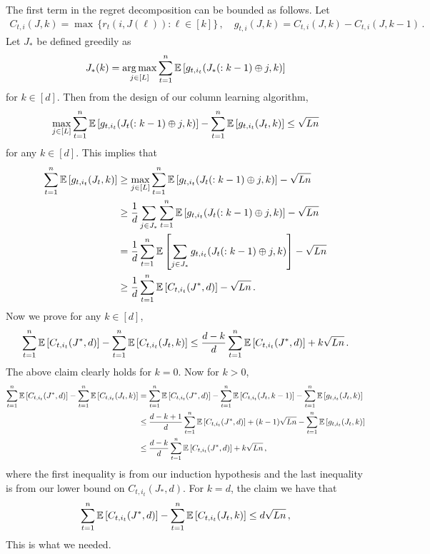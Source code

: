 The first term in the regret decomposition can be bounded as follows. Let
\begin{align*}
  C_{t, i}(J, k) =
  \max \, \{r_t(i, J(\ell)): \ell \in [k]\}\,, \quad
  g_{t, i}(J, k) =
  C_{t, i}(J, k) -   C_{t, i}(J, k - 1)\,.
\end{align*}
Let $J_\ast$ be defined greedily as
\begin{align*}
  J_\ast(k) =
  \mathop{\rm arg\,max}_{j \in [L]} \sum_{t = 1}^n \mathbb{E}\left[g_{t, i_t}(J_\ast(: k - 1) \oplus j, k)\right]
\end{align*}
for $k \in [d]$. Then from the design of our column learning algorithm,
\begin{align*}
  \max_{j \in [L]} \sum_{t = 1}^n \mathbb{E}\left[g_{t, i_t}(J_t(: k - 1) \oplus j, k)\right] -
  \sum_{t = 1}^n \mathbb{E}\left[g_{t, i_t}(J_t, k)\right] \leq
  \sqrt{L n}
\end{align*}
for any $k \in [d]$. This implies that
\begin{align*}
  \sum_{t = 1}^n \mathbb{E}\left[g_{t, i_t}(J_t, k)\right]
  & \geq \max_{j \in [L]} \sum_{t = 1}^n \mathbb{E}\left[g_{t, i_t}(J_t(: k - 1) \oplus j, k)\right] - \sqrt{L n} \\
  & \geq \frac{1}{d} \sum_{j \in J_\ast} \sum_{t = 1}^n \mathbb{E}\left[g_{t, i_t}(J_t(: k - 1) \oplus j, k)\right] - \sqrt{L n} \\
  & = \frac{1}{d} \sum_{t = 1}^n \mathbb{E}\left[\sum_{j \in J_\ast} g_{t, i_t}(J_t(: k - 1) \oplus j, k)\right] - \sqrt{L n} \\
  & \geq \frac{1}{d} \sum_{t = 1}^n \mathbb{E}\left[C_{t, i_t}(J^\ast, d)\right] - \sqrt{L n}\,.
\end{align*}
Now we prove for any $k \in [d]$,
\begin{align*}
  \sum_{t = 1}^n \mathbb{E}\left[C_{t, i_t}(J^\ast, d)\right] - \sum_{t = 1}^n \mathbb{E}\left[C_{t, i_t}(J_t, k)\right] \leq
  \frac{d - k}{d} \sum_{t = 1}^n \mathbb{E}\left[C_{t, i_t}(J^\ast, d)\right] + k \sqrt{L n}\,.
\end{align*}
The above claim clearly holds for $k = 0$. Now for $k > 0$,
\begin{align*}
  \sum_{t = 1}^n \mathbb{E}\left[C_{t, i_t}(J^\ast, d)\right] - \sum_{t = 1}^n \mathbb{E}\left[C_{t, i_t}(J_t, k)\right]
  & = \sum_{t = 1}^n \mathbb{E}\left[C_{t, i_t}(J^\ast, d)\right] - \sum_{t = 1}^n \mathbb{E}\left[C_{t, i_t}(J_t, k - 1)\right] -
  \sum_{t = 1}^n \mathbb{E}\left[g_{t, i_t}(J_t, k)\right] \\
  & \leq \frac{d - k + 1}{d} \sum_{t = 1}^n \mathbb{E}\left[C_{t, i_t}(J^\ast, d)\right] + (k - 1) \sqrt{L n} -
  \sum_{t = 1}^n \mathbb{E}\left[g_{t, i_t}(J_t, k)\right] \\
  & \leq \frac{d - k}{d} \sum_{t = 1}^n \mathbb{E}\left[C_{t, i_t}(J^\ast, d)\right] + k \sqrt{L n}\,,
\end{align*}
where the first inequality is from our induction hypothesis and the last inequality is from our lower bound on $C_{t, i_t}(J_\ast, d)$. For $k = d$, the claim we have that
\begin{align*}
  \sum_{t = 1}^n \mathbb{E}\left[C_{t, i_t}(J^\ast, d)\right] - \sum_{t = 1}^n \mathbb{E}\left[C_{t, i_t}(J_t, k)\right] \leq
  d \sqrt{L n}\,,
\end{align*}
This is what we needed.

